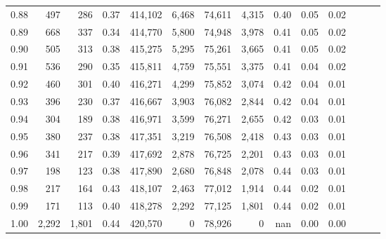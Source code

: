 \begin{tabular}{rrrrrrrrrrrrrr}
0.88 &     497 &    286 &  0.37 &  414,102 &    6,468 &  74,611 &   4,315 &  0.40 &  0.05 &      0.02 \\
0.89 &     668 &    337 &  0.34 &  414,770 &    5,800 &  74,948 &   3,978 &  0.41 &  0.05 &      0.02 \\
0.90 &     505 &    313 &  0.38 &  415,275 &    5,295 &  75,261 &   3,665 &  0.41 &  0.05 &      0.02 \\
0.91 &     536 &    290 &  0.35 &  415,811 &    4,759 &  75,551 &   3,375 &  0.41 &  0.04 &      0.02 \\
0.92 &     460 &    301 &  0.40 &  416,271 &    4,299 &  75,852 &   3,074 &  0.42 &  0.04 &      0.01 \\
0.93 &     396 &    230 &  0.37 &  416,667 &    3,903 &  76,082 &   2,844 &  0.42 &  0.04 &      0.01 \\
0.94 &     304 &    189 &  0.38 &  416,971 &    3,599 &  76,271 &   2,655 &  0.42 &  0.03 &      0.01 \\
0.95 &     380 &    237 &  0.38 &  417,351 &    3,219 &  76,508 &   2,418 &  0.43 &  0.03 &      0.01 \\
0.96 &     341 &    217 &  0.39 &  417,692 &    2,878 &  76,725 &   2,201 &  0.43 &  0.03 &      0.01 \\
0.97 &     198 &    123 &  0.38 &  417,890 &    2,680 &  76,848 &   2,078 &  0.44 &  0.03 &      0.01 \\
0.98 &     217 &    164 &  0.43 &  418,107 &    2,463 &  77,012 &   1,914 &  0.44 &  0.02 &      0.01 \\
0.99 &     171 &    113 &  0.40 &  418,278 &    2,292 &  77,125 &   1,801 &  0.44 &  0.02 &      0.01 \\
1.00 &   2,292 &  1,801 &  0.44 &  420,570 &        0 &  78,926 &       0 &   nan &  0.00 &      0.00 \\
\bottomrule
\end{tabular}
